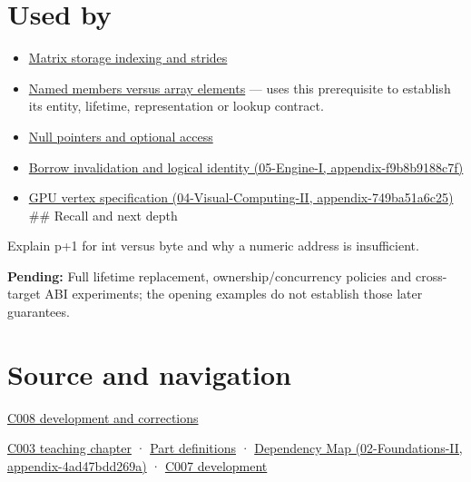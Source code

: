 \section{Used by}\label{appendix-6af5921bc853-used-by}

\begin{itemize}
\item
  \hyperref[appendix-ffdc1d4e5350]{Matrix storage indexing and strides}
\item
  \hyperref[appendix-3f7e15effba6]{Named members versus array elements} --- uses this prerequisite to establish its entity, lifetime, representation or lookup contract.
\item
  \hyperref[appendix-afae48c31800]{Null pointers and optional access}
\item
  \href{../05-Engine-I/main.pdf\#nameddest=appendix-f9b8b9188c7f}{Borrow invalidation and logical identity (05-Engine-I, appendix-f9b8b9188c7f)}
\item
  \href{../04-Visual-Computing-II/main.pdf\#nameddest=appendix-749ba51a6c25}{GPU vertex specification (04-Visual-Computing-II, appendix-749ba51a6c25)} \#\# Recall and next depth
\end{itemize}

Explain p+1 for int versus byte and why a numeric address is insufficient.

\textbf{Pending:} Full lifetime replacement, ownership/concurrency policies and cross-target ABI experiments; the opening examples do not establish those later guarantees.

\section{Source and navigation}\label{appendix-6af5921bc853-source-and-navigation}

\hyperref[appendix-fd090d982a15-m008---parts-113-126]{C008 development and corrections}

\href{Continuous\%20Notes/Computing\%20Foundations\%20-\%20From\%20Bits\%20to\%20C++\%20and\%20Systems\%20APIs\#Where\%20the\%20bytes\%20live}{C003 teaching chapter} · \hyperref[appendix-fd090d982a15-m003---parts-41-60]{Part definitions} · \href{../02-Foundations-II/main.pdf\#nameddest=appendix-4ad47bdd269a}{Dependency Map (02-Foundations-II, appendix-4ad47bdd269a)} · \href{Continuous\%20Notes/Computing\%20Foundations\%20-\%20From\%20Bits\%20to\%20C++\%20and\%20Systems\%20APIs\#Bringing\%20the\%20object\%20model\%20back\%20to\%20bytes}{C007 development}
